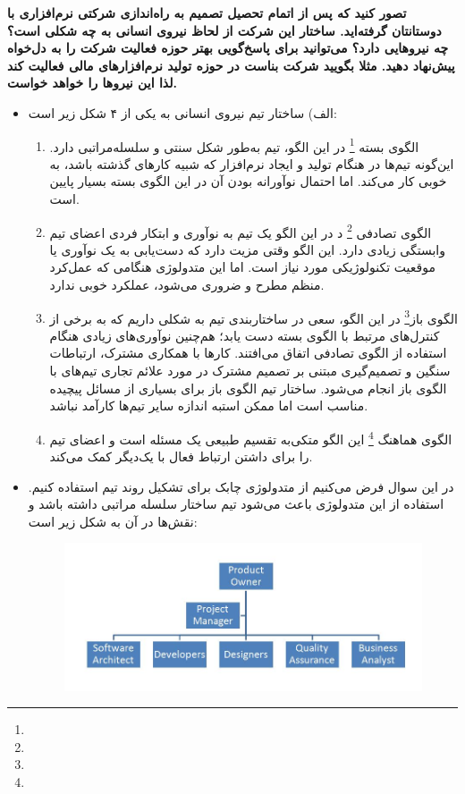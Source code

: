 
\textbf{تصور کنید که پس از اتمام تحصیل تصمیم به راه‌اندازی شرکتی نرم‌افزاری با دوستانتان گرفته‌اید. ساختار این شرکت از لحاظ نیروی انسانی به چه شکلی است؟ چه نیروهایی دارد؟ می‌توانید برای پاسخ‌گویی بهتر حوزه فعالیت شرکت را به دل‌خواه پیش‌نهاد دهید. مثلا بگویید شرکت بناست در حوزه تولید نرم‌افزارهای مالی فعالیت کند لذا این نیروها را خواهد خواست. }
\newline

\begin{itemize}
	\item الف)
	ساختار تیم نیروی انسانی به یکی از ۴ شکل زیر است: 
	\begin{enumerate}
		\item الگوی بسته \footnote{}
		در این الگو، تیم به‌طور شکل سنتی و سلسله‌مراتبی دارد. این‌گونه تیم‌ها در هنگام تولید و ایجاد نرم‌افزار که شبیه کارهای گذشته باشد، به خوبی کار می‌کند. اما احتمال نوآورانه بودن آن در این الگوی بسته بسیار پایین است. 
		\item الگوی تصادفی \footnote{} د
		در این الگو یک تیم به نوآوری و  ابتکار فردی اعضای تیم وابستگی زیادی دارد. این الگو وقتی مزیت دارد که دست‌یابی به یک نوآوری یا موقعیت تکنولوژیکی مورد نیاز است. اما این متدولوژی هنگامی که عمل‌کرد منظم مطرح و ضروری می‌شود، عملکرد خوبی ندارد.
		\item الگوی باز\footnote{}
		در این الگو، سعی در ساختاربندی تیم به شکلی داریم که به برخی از کنترل‌های مرتبط با الگوی بسته دست یابد؛ هم‌چنین نوآوری‌های زیادی هنگام استفاده از الگوی تصادفی اتفاق می‌افتند. کارها با همکاری مشترک، ارتباطات سنگین و تصمیم‌گیری مبتنی بر تصمیم مشترک در مورد علائم تجاری تیم‌های با الگوی باز انجام می‌شود. ساختار تیم الگوی باز برای بسیاری از مسائل پیچیده مناسب است اما ممکن استبه اندازه سایر تیم‌ها کارآمد نباشد. 
		\item الگوی هماهنگ
		\footnote{} 
		 این الگو متکی‌به تقسیم طبیعی یک مسئله است و اعضای تیم را برای داشتن ارتباط فعال با یک‌دیگر کمک می‌کند.
	\end{enumerate}
	\item در این سوال فرض می‌کنیم از متدولوژی چابک برای تشکیل روند تیم استفاده کنیم. استفاده از این متدولوژی باعث می‌شود تیم ساختار سلسله مراتبی داشته باشد و نقش‌ها در آن به شکل زیر است:
	\begin{figure}[!h]
		\begin{center}
			\includegraphics[width=\linewidth]{./5.jpg}

\end{center}
\end{figure}
\end{itemize}
